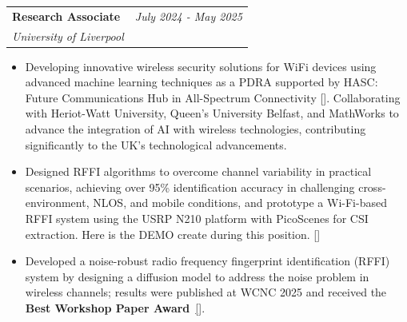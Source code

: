 \documentclass[a4paper,11pt]{article}
\makeatletter
\newcommand{\resumeProject}[4]{
\vspace{0.5mm}\item
    \begin{tabular*}{0.98\textwidth}[t]{l@{\extracolsep{\fill}}r}
        \textbf{#1} & \textit{\footnotesize{#3}} \\
        \footnotesize{\textit{#2}} & \footnotesize{#4}
    \end{tabular*}
    \vspace{-2.4mm}
}
\newcommand{\resumeItemListStart}{\begin{itemize}[leftmargin=*,labelsep=1mm,itemsep=0.5mm]}
\newcommand{\resumeItemListEnd}{\end{itemize}\vspace{-2mm}}
\makeatother
\begin{document}
\resumeProject
  {Research Associate}
  {University of Liverpool}
  {July 2024 - May 2025}
  {}
\resumeItemListStart
        \item Developing innovative wireless security solutions for WiFi devices using advanced machine learning techniques as a PDRA supported by HASC: Future Communications Hub in All-Spectrum Connectivity [\href{https://allspectrumhub.org/}{\textcolor{darkblue}{}}]. Collaborating with Heriot-Watt University, Queen’s University Belfast, and MathWorks to advance the integration of AI with wireless technologies, contributing significantly to the UK’s technological advancements.

        \item Designed RFFI algorithms to overcome channel variability in practical scenarios, achieving over 95\% identification accuracy in challenging cross-environment, NLOS, and mobile conditions, and prototype a Wi-Fi-based RFFI system using the USRP N210 platform with PicoScenes for CSI extraction. Here is the DEMO create during this position. [\href{https://www.youtube.com/watch?v=jQuvRcBXh8I}{\textcolor{darkblue}{}}]

        \item Developed a noise-robust radio frequency fingerprint identification (RFFI) system by designing a diffusion model to address the noise problem in wireless channels; results were published at WCNC 2025 and received the \textbf{Best Workshop Paper Award}~\href{https://wcnc2025.ieee-wcnc.org/program-0/program-glance/best-paper-awards}[{\textcolor{darkblue}{}}].

\resumeItemListEnd

    
\end{document}
